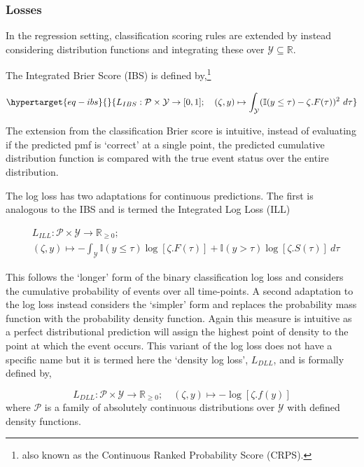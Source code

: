 \documentclass[
  letterpaper,
]{scrbook}
\theoremstyle{plain}
\theoremstyle{definition}
\theoremstyle{remark}
\begin{document}
\hypertarget{losses-1}{%
\subsubsection*{Losses}\label{losses-1}}

In the regression setting, classification scoring rules are extended by
instead considering distribution functions and integrating these over
\(\mathcal{Y}\subseteq \mathbb{R}\).

The Integrated Brier Score (IBS) is defined by,\footnote{also known as
  the Continuous Ranked Probability Score (CRPS).}

\begin{equation}\protect\hypertarget{eq-ibs}{}{
L_{IBS}:\mathcal{P}\times \mathcal{Y}\rightarrow [0,1]; \quad
(\zeta, y) \mapsto \int_{\mathcal{Y}} (\mathbb{I}(y \leq \tau) - \zeta.F(\tau))^2 \ d\tau
}\label{eq-ibs}\end{equation}

The extension from the classification Brier score is intuitive, instead
of evaluating if the predicted pmf is `correct' at a single point, the
predicted cumulative distribution function is compared with the true
event status over the entire distribution.

The log loss has two adaptations for continuous predictions. The first
is analogous to the IBS and is termed the Integrated Log Loss (ILL)

\[
\begin{split}
&L_{ILL}:\mathcal{P}\times \mathcal{Y}\rightarrow \mathbb{R}_{\geq 0}; \\
&(\zeta, y) \mapsto - \int_{\mathcal{Y}} \mathbb{I}(y \leq \tau)\log[\zeta.F(\tau)] + \mathbb{I}(y > \tau)\log[\zeta.S(\tau)] \ d\tau
\end{split}
\]

This follows the `longer' form of the binary classification log loss and
considers the cumulative probability of events over all time-points. A
second adaptation to the log loss instead considers the `simpler' form
and replaces the probability mass function with the probability density
function. Again this measure is intuitive as a perfect distributional
prediction will assign the highest point of density to the point at
which the event occurs. This variant of the log loss does not have a
specific name but it is termed here the `density log loss', \(L_{DLL}\),
and is formally defined by,

\[
L_{DLL}:\mathcal{P}\times \mathcal{Y}\rightarrow \mathbb{R}_{\geq 0}; \quad
(\zeta, y) \mapsto - \log[\zeta.f(y)]
\label{eq:density_logloss}
\] where \(\mathcal{P}\) is a family of absolutely continuous
distributions over \(\mathcal{Y}\) with defined density functions.
\end{document}
